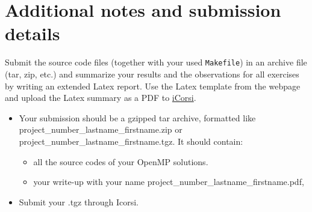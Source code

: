 \documentclass[unicode,11pt,a4paper,oneside,numbers=endperiod,openany]{scrartcl}
\begin{document}
\section*{Additional notes and submission details}
Submit the source code files (together with your used \texttt{Makefile}) in
an archive file (tar, zip, etc.) and summarize your results and the
observations for all exercises by writing an extended Latex report.
Use the Latex template from the webpage and upload the Latex summary
as a PDF to \href{https://www.icorsi.ch/course/view.php?id=12615}{iCorsi}.

\begin{itemize}
\item Your submission should be a gzipped tar archive, formatted like project\_number\_lastname\_firstname.zip or project\_number\_lastname\_firstname.tgz. 
      It should contain:
  \begin{itemize}
    \item all the source codes of your OpenMP solutions.
    \item your write-up with your name  project\_number\_lastname\_firstname.pdf, 
  \end{itemize}
   \item Submit your .tgz through Icorsi.
  \end{itemize}
\end{document}
